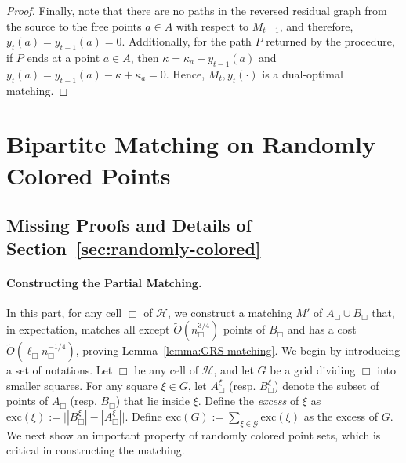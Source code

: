 \documentclass[11pt,onecolumn]{article}
\def\mcG{{\mathcal{G}}}
\def\mcH{{\mathcal{H}}}
\newcommand{\cell}{\Box}
\newcommand{\excess}{\mathrm{exc}}
\newcommand\myparagraph[1]{\paragraph{#1}}
\begin{document}
\begin{proof}
Finally, note that there are no paths in the reversed residual graph from the source to the free points $a\in A$ with respect to $M_{t-1}$, and therefore, $y_t(a)=y_{t-1}(a)=0$. Additionally, for the path $P$ returned by the procedure, if $P$ ends at a point $a\in A$, then $\kappa = \kappa_a+y_{t-1}(a)$ and $y_t(a)=y_{t-1}(a)-\kappa+\kappa_a = 0$. Hence, $M_t, y_t(\cdot)$ is a dual-optimal matching. 
\end{proof}

%
%
%
%
%
%
%
%
%
%
%
%
%
%
%
%
%



%
%



%


\section{Bipartite Matching on Randomly Colored Points}

\subsection{Missing Proofs and Details of Section~\ref{sec:randomly-colored}}\label{appendix-randomly-colored}

\myparagraph{Constructing the Partial Matching.} In this part, for any cell $\cell$ of $\mcH$, we construct a matching $M'$ of $A_\cell\cup B_\cell$ that, in expectation, matches all except $\tilde{O}(n_\cell^{3/4})$ points of $B_\cell$ and has a cost $\tilde{O}(\ell_\cell n_\cell^{-1/4})$, proving Lemma~\ref{lemma:GRS-matching}.
We begin by introducing a set of notations. Let $\cell$ be any cell of $\mcH$, and let $G$ be a grid dividing $\cell$ into smaller squares.
For any square $\xi\in G$, let $A_\cell^\xi$ (resp. $B_\cell^\xi$) denote the subset of points of $A_\cell$ (resp. $B_\cell$) that lie inside $\xi$. Define the \emph{excess} of $\xi$ as $\excess(\xi):=\big||B_\cell^\xi| - |A_\cell^\xi|\big|$. Define $\excess(G):=\sum_{\xi\in\mcG}\excess(\xi)$ as the excess of $G$. We next show an important property of randomly colored point sets, which is critical in constructing the matching. 
\end{document}
